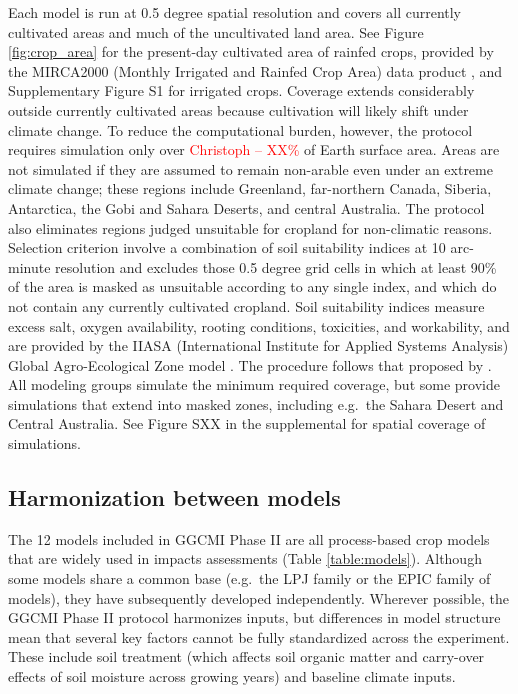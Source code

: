 \documentclass[gmd, manuscript]{copernicus} %
\begin{document}
Each model is run at 0.5 degree spatial resolution and covers all currently cultivated areas and much of the uncultivated land area. See Figure \ref{fig:crop_area} for the present-day cultivated area of rainfed crops, provided by the MIRCA2000 (Monthly Irrigated and Rainfed Crop Area) data product \citep{Portmann2010}, and Supplementary Figure S1 for irrigated crops. 
Coverage extends considerably outside currently cultivated areas because cultivation will likely shift under climate change.  
To reduce the computational burden, however, the protocol requires simulation only over \textcolor{red}{Christoph -- XX\%} of Earth surface area.  
Areas are not simulated if they are assumed to remain non-arable even under an extreme climate change; these regions include Greenland, far-northern Canada, Siberia, Antarctica, the Gobi and Sahara Deserts, and central Australia. 
The protocol also eliminates regions judged unsuitable for cropland for non-climatic reasons. 
Selection criterion involve a combination of soil suitability indices at 10 arc-minute resolution and excludes those 0.5 degree grid cells in which at least 90\% of the area is masked as unsuitable according to any single index, and which do not contain any currently cultivated cropland. 
Soil suitability indices measure excess salt, oxygen availability, rooting conditions, toxicities, and workability, and are provided by the IIASA (International Institute for Applied Systems Analysis) Global Agro-Ecological Zone model \citep[GAEZ, ][]{gaez}. 
The procedure follows that proposed by \citet{pugh_climate_2016}. 
All modeling groups simulate the minimum required coverage, but some provide simulations that extend into masked zones, including e.g.\ the Sahara Desert and Central Australia.
See Figure SXX in the supplemental for spatial coverage of simulations.

\subsection{Harmonization between models}
The 12 models included in GGCMI Phase II are all process-based crop models that are widely used in impacts assessments (Table \ref{table:models}).
Although some models share a common base (e.g.\ the LPJ family or the EPIC family of models), they have subsequently developed independently.  
Wherever possible, the GGCMI Phase II protocol harmonizes inputs, but
differences in model structure mean that several key factors cannot be fully standardized across the experiment. These include soil treatment (which affects soil organic matter and carry-over effects of soil moisture across growing years) and baseline climate inputs.  
\end{document}
